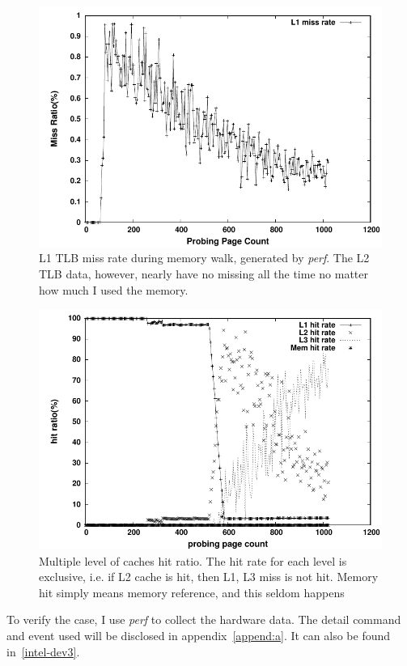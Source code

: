 \begin{figure}[hpb]
\centering
\includegraphics[width=0.9\linewidth]{../figures/tlb}
\caption{L1 TLB miss rate during memory walk, generated by \emph{perf}. The L2 TLB data, however, nearly have no missing all the time no matter how much I used the memory.
}
\label{fig:tlbsz-tlb}
\end{figure}

\begin{figure}[htp]
\centering
\includegraphics[width=0.9\linewidth]{../figures/cache}
\caption{Multiple level of caches hit ratio. The hit rate for each level is exclusive, i.e. if L2 cache is hit, then L1, L3 miss is not hit. Memory hit simply means memory reference, and this seldom happens}
\label{fig:tlbsz-cache}
\end{figure}

To verify the case, I use \emph{perf} to collect the hardware data. The detail
command and event used will be disclosed in appendix~\ref{append:a}. It can
also be found in~\ref{intel-dev3}.

